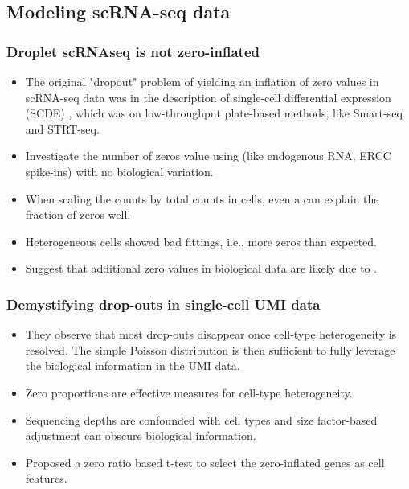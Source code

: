 \subsection*{Modeling scRNA-seq data}
\begin{frame}
  \frametitle{Droplet scRNAseq is not zero-inflated \cite{svensson2020droplet}}
  \begin{itemize}
  \item
    The original "dropout" problem of yielding an inflation of zero values
    in scRNA-seq data was in the description of single-cell differential
    expression (SCDE) \cite{kharchenko2014bayesian}, which was on low-throughput
    plate-based methods, like Smart-seq and STRT-seq.
  \item
    Investigate the number of zeros value using 
    (like endogenous RNA, ERCC spike-ins) with no
    biological variation. 
  \item
    When scaling the counts by total counts in cells, even a  can explain the fraction of zeros well.
  \item
    Heterogeneous cells showed bad fittings, i.e., more zeros than expected.
  \item
    Suggest that additional zero values in biological data are likely due to
    . 
  \end{itemize}
\end{frame}

\begin{frame}
  \frametitle{Demystifying drop-outs in single-cell UMI data
    \cite{kim2020demystifying}}
  \begin{itemize}
  \item
    They observe that most drop-outs disappear once cell-type heterogeneity is
    resolved. The simple Poisson distribution is then sufficient to fully leverage
    the biological information in the UMI data.
  \item
    Zero proportions are effective measures for cell-type heterogeneity.
  \item
    Sequencing depths are confounded with cell types and size factor-based
    adjustment can obscure biological information.
  \item
    Proposed a zero ratio based t-test to select the zero-inflated genes as cell
    features. 
  \end{itemize}
\end{frame}

